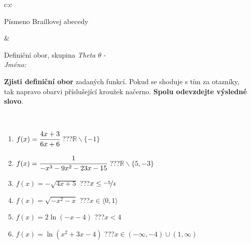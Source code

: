 \documentclass[10pt]{report}
\begin{document}
\begin{tabular}{c:c}
\begin{minipage}[c][104.5mm][t]{0.5\linewidth}
\begin{center}
\begin{minipage}{0.20\linewidth}
\begin{center}
{\small Písmeno Braillovej abecedy}
\end{center}
\end{minipage}
\end{center}
\end{minipage}
&
\begin{minipage}[c][104.5mm][t]{0.5\linewidth}
\begin{center}
\vspace{7mm}
{\huge Definiční obor, skupina \textit{Theta $\theta$} -}\\[5mm]
\textit{Jméno:}\phantom{xxxxxxxxxxxxxxxxxxxxxxxxxxxxxxxxxxxxxxxxxxxxxxxxxxxxxxxxxxxxxxxxx}\\[5mm]
\begin{minipage}{0.95\linewidth}
\begin{center}
\textbf{Zjisti definiční obor} zadaných funkcí. Pokud se shoduje s tím za otazníky,\\tak napravo obarvi příslušející kroužek načerno. \textbf{Spolu odevzdejte výsledné slovo}.
\end{center}
\end{minipage}
\\[1mm]
\begin{minipage}{0.79\linewidth}
\begin{center}
\begin{varwidth}{\linewidth}
\begin{enumerate}
\normalsizerrr
\item $f(x)=\cfrac{4x+3}{6x+6}$\quad \dotfill\; ???\;\dotfill \quad $\mathbb{R}\smallsetminus\{-1\}$
\item $f(x)=\cfrac{1}{-x^3-9x^2-23x-15}$\quad \dotfill\; ???\;\dotfill \quad $\mathbb{R}\smallsetminus\{5,-3\}$
\item $f(x)=-\sqrt{4x+5}$\quad \dotfill\; ???\;\dotfill \quad $x\leq\nicefrac{-5}{4}$
\item $f(x)=\sqrt{-x^2-x}$\quad \dotfill\; ???\;\dotfill \quad $x\in\langle0 , 1\rangle$
\item $f(x)=2\ln{(-x-4)}$\quad \dotfill\; ???\;\dotfill \quad $x<4$
\item $f(x)=\ln{(x^2+3x-4)}$\quad \dotfill\; ???\;\dotfill \quad $x\in(-\infty , -4)\cup(1 , \infty)$
\end{enumerate}
\end{varwidth}
\end{center}
\end{minipage}
\begin{minipage}{0.20\linewidth}
\begin{center}

\end{center}
\end{minipage}
\end{center}
\end{minipage}
\end{tabular}
\end{document}
